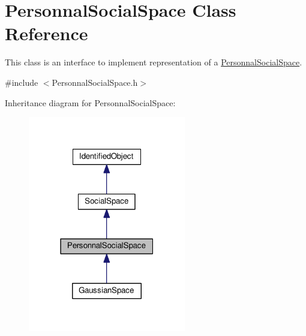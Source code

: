 \hypertarget{classPersonnalSocialSpace}{}\section{Personnal\+Social\+Space Class Reference}
\label{classPersonnalSocialSpace}


This class is an interface to implement representation of a \hyperlink{classPersonnalSocialSpace}{Personnal\+Social\+Space}.  




{\ttfamily \#include $<$Personnal\+Social\+Space.\+h$>$}



Inheritance diagram for Personnal\+Social\+Space\+:\nopagebreak
\begin{figure}[H]
\begin{center}
\leavevmode
\includegraphics[width=195pt]{classPersonnalSocialSpace__inherit__graph}
\end{center}
\end{figure}


